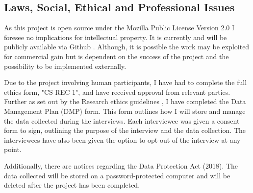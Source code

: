 \documentclass [11pt,a4paper]{article}
\begin{document}


\subsection{Laws, Social, Ethical and Professional Issues}
\label{sec:computer_laws}
As this project is open source under the Mozilla Public License Version 2.0 I foresee no implications for intellectual property. It is currently and will be publicly available via Github \cite{keeptrackgithub}. Although, it is possible the work may be exploited for commercial gain but is dependent on the success of the project and the possibility to be implemented externally.

Due to the project involving human participants, I have had to complete the full ethics form, "CS REC 1", and have received approval from relevant parties. Further as set out by the Research ethics guidelines \cite{ethicsguidelines}, I have completed the Data Management Plan (DMP) form. This form outlines how I will store and manage the data collected during the interviews. Each interviewee was given a consent form to sign, outlining the purpose of the interview and the data collection. The interviewees have also been given the option to opt-out of the interview at any point.

Additionally, there are notices regarding the Data Protection Act (2018). The  data collected will be stored on a password-protected computer and will be deleted after the project has been completed.
\end{document}
